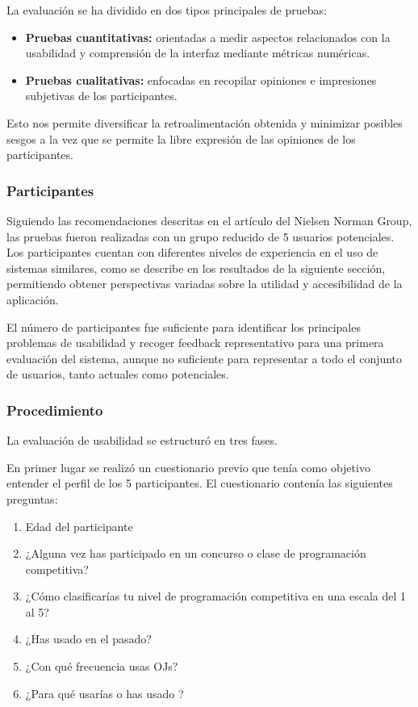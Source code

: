 La evaluación se ha dividido en dos tipos principales de pruebas:

\begin{itemize}
    \item \textbf{Pruebas cuantitativas:} orientadas a medir aspectos relacionados con la usabilidad y comprensión de la interfaz mediante métricas numéricas.
    \item \textbf{Pruebas cualitativas:} enfocadas en recopilar opiniones e impresiones subjetivas de los participantes.
\end{itemize}

Esto nos permite diversificar la retroalimentación obtenida y minimizar posibles sesgos a la vez que se permite la libre expresión de las opiniones de los participantes.

\subsubsection{Participantes}

Siguiendo las recomendaciones descritas en el artículo del Nielsen Norman Group, las pruebas fueron realizadas con un grupo reducido de 5 usuarios potenciales. Los participantes cuentan con diferentes niveles de experiencia en el uso de sistemas similares, como se describe en los resultados de la siguiente sección, permitiendo obtener perspectivas variadas sobre la utilidad y accesibilidad de la aplicación. 

El número de participantes fue suficiente para identificar los principales problemas de usabilidad y recoger feedback representativo para una primera evaluación del sistema, aunque no suficiente para representar a todo el conjunto de usuarios, tanto actuales como potenciales.

\subsubsection{Procedimiento}

La evaluación de usabilidad se estructuró en tres fases. 

En primer lugar se realizó un cuestionario previo que tenía como objetivo entender el perfil de los 5 participantes. El cuestionario contenía las siguientes preguntas:
\begin{enumerate}
    \item Edad del participante
    \item ¿Alguna vez has participado en un concurso o clase de programación competitiva?
    \item ¿Cómo clasificarías tu nivel de programación competitiva en una escala del 1 al 5?
    \item ¿Has usado \aer en el pasado?
    \item ¿Con qué frecuencia usas OJs?
    \item ¿Para qué usarías o has usado \aer?
\end{enumerate}

